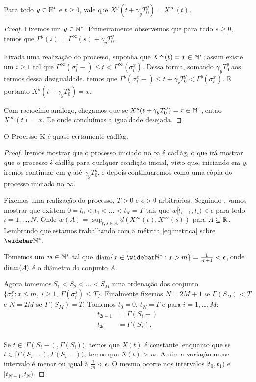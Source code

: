 \begin{proposicao}
  \label{prop:reinicia-infinito}
  Para todo $y \in {\mathbb{N^*}}$ e $t \geq 0$, vale que
  $X^y(t + \gamma_y T_0^y) = X^\infty(t)$.
\end{proposicao}
\begin{proof}
  Fixemos um $y \in {\mathbb{N^*}}$. Primeiramente observemos que para todo $s
  \geq 0$, temos que $\Gamma^y(s) = \Gamma^\infty(s) + \gamma_yT^y_0$.

  Fixada uma realização do processo, suponha que $X^\infty(t) = x \in
  {\mathbb{N^*}}$; assim existe um $i \geq 1$ tal que $\Gamma^\infty(\sigma_i^x-)
  \leq t < \Gamma^\infty(\sigma_i^x)$. Dessa forma, somando $\gamma_y
  T^y_0$ aos termos dessa desigualdade, temos que
  $\Gamma^y(\sigma_i^x-) \leq t+\gamma_yT_0^y <
  \Gamma^y(\sigma_i^x)$. E portanto $X^y(t+\gamma_y T_0^y) = x$.

  Com raciocínio análogo, chegamos que se $X^y(t+\gamma_y T_0^y) = x
  \in {\mathbb{N^*}}$, então $X^\infty(t) = x$. De onde concluímos a igualdade
  desejada.
\end{proof}


\begin{proposicao}
  \label{prop:proc-cadlag}
  O Processo K é quase certamente càdlàg.
\end{proposicao}
\begin{proof}

  Iremos mostrar que o processo iniciado no $\infty$ é càdlàg, o que
  irá mostrar que o processo é càdlàg para qualquer condição inicial,
  visto que, iniciando em $y$, iremos continuar em $y$ até $\gamma_y
  T^y_0$, e depois continuaremos como uma cópia do processo iniciado
  no $\infty$.

  Fixemos uma realização do processo, $T > 0$ e $\epsilon > 0$
  arbitrários. Seguindo \cite{billingsley:99}, vamos mostrar que
  existem $0 = t_0 < t_1 < \ldots < t_N = T$ tais que $w[t_{i-1}, t_i)
  < \epsilon$ para todo $i = 1, \ldots, N$. Onde $w(A) = \sup_{t, s
    \in A} d(X^\infty(t), X^\infty(s))$ para $A \subseteq
  {\mathbb{R}}$. Lembrando que estamos trabalhando com a métrica
  \eqref{eq:metrica} sobre $\Nzb$.

  Tomemos um $m \in {\mathbb{N^*}}$ tal que $\diam\{x \in \Nzb: x > m \} =
  \frac{1}{m+1} < \epsilon$, onde ${\mathrm{diam}}(A)$ é o diâmetro do conjunto
  $A$.

  Agora tomemos $S_1 < S_2 < \ldots < S_M$ uma ordenação dos conjunto $\{
  \sigma^x_i: x \leq m, \: i \geq 1, \: \Gamma(\sigma^x_i) \leq
  T\}$. Finalmente fixemos $N = 2M+1$ se $\Gamma(S_M) < T$ e $N = 2M$
  se $\Gamma(S_M) = T$. Tomemos $t_0 = 0$, $t_N = T$ e para $i=1,\ldots, M$:
  \begin{align*}
    t_{2i-1} &= \Gamma(S_i-)\\
    t_{2i} &= \Gamma(S_i).\\
  \end{align*}

  Se $t \in [\Gamma(S_i-), \Gamma(S_i))$, temos que $X(t)$ é
  constante, enquanto que se $t \in [\Gamma(S_{i-1}),
  \Gamma(S_{i}-))$, temos que $X(t) > m$. Assim a variação nesse
  intervalo é menor ou igual à $\frac{1}{m} < \epsilon$. O mesmo
  ocorre nos intervalos $[t_0, t_1)$ e $[t_{N-1}, t_N)$.
\end{proof}

